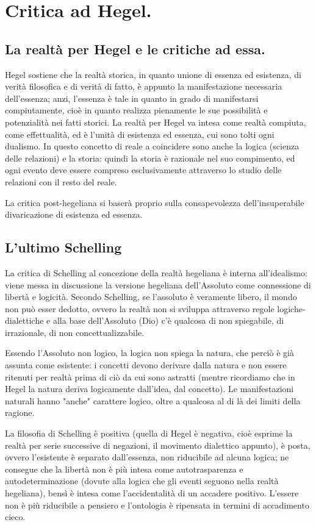 \chapter{Critica ad Hegel.}
\bigskip
\section{La realtà per Hegel e le critiche ad essa.}

Hegel sostiene che la realtà storica, in quanto unione di essenza ed esistenza, di verità filosofica e di verità di fatto, è appunto la manifestazione necessaria dell'essenza; anzi, l'essenza è tale in quanto in grado di manifestarsi compiutamente, cioè in quanto realizza pienamente le sue possibilità e potenzialità nei fatti storici. La realtà per Hegel va intesa come realtà compiuta, come effettualità, ed è l'unità di esistenza ed essenza, cui sono tolti ogni dualismo. In questo concetto di reale a coincidere sono anche la logica (scienza delle relazioni) e la storia: quindi la storia è razionale nel suo compimento, ed ogni evento deve essere compreso esclusivamente attraverso lo studio delle relazioni con il resto del reale.

La critica post-hegeliana si baserà proprio sulla consapevolezza dell'insuperabile divaricazione di esistenza ed essenza.

\section{L'ultimo Schelling}

La critica di Schelling al concezione della realtà hegeliana è interna all'idealismo: viene messa in discussione la versione hegeliana dell'Assoluto come connessione di libertà e logicità. Secondo Schelling, se l'assoluto è veramente libero, il mondo non può esser dedotto, ovvero la realtà non si sviluppa attraverso regole logiche-dialettiche  e alla base dell'Assoluto (Dio) c'è qualcosa di non spiegabile, di irrazionale, di non concettualizzabile.

Essendo l'Assoluto non logico, la logica non spiega la natura, che perciò è già assunta come esistente: i concetti devono derivare dalla natura e non essere ritenuti per realtà prima di ciò da cui sono astratti (mentre ricordiamo che in Hegel la natura deriva logicamente dall'idea, dal concetto). Le manifestazioni naturali hanno "anche" carattere logico, oltre a qualcosa al di là dei limiti della ragione.

La filosofia di Schelling è positiva (quella di Hegel è negativa, cioè esprime la realtà per serie successive di negazioni, il movimento dialettico appunto), è posta, ovvero l'esistente è separato dall'essenza, non riducibile ad alcuna logica; ne consegue che la libertà non è più intesa come autotrasparenza e autodeterminazione (dovute alla logica che gli eventi seguono nella realtà hegeliana), bensì è intesa come l'accidentalità di un accadere positivo. L'essere non è più riducibile a pensiero e l'ontologia è ripensata in termini di accadimento cieco.

